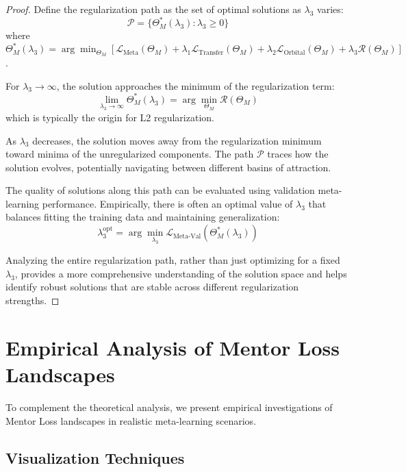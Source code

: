 \begin{proof}
Define the regularization path as the set of optimal solutions as $\lambda_3$ varies:
\begin{equation}
\mathcal{P} = \{\Theta_M^*(\lambda_3) : \lambda_3 \geq 0\}
\end{equation}
where $\Theta_M^*(\lambda_3) = \arg\min_{\Theta_M} [\mathcal{L}_{\text{Meta}}(\Theta_M) + \lambda_1 \mathcal{L}_{\text{Transfer}}(\Theta_M) + \lambda_2 \mathcal{L}_{\text{Orbital}}(\Theta_M) + \lambda_3 \mathcal{R}(\Theta_M)]$.

For $\lambda_3 \to \infty$, the solution approaches the minimum of the regularization term:
\begin{equation}
\lim_{\lambda_3 \to \infty} \Theta_M^*(\lambda_3) = \arg\min_{\Theta_M} \mathcal{R}(\Theta_M)
\end{equation}
which is typically the origin for L2 regularization.

As $\lambda_3$ decreases, the solution moves away from the regularization minimum toward minima of the unregularized components. The path $\mathcal{P}$ traces how the solution evolves, potentially navigating between different basins of attraction.

The quality of solutions along this path can be evaluated using validation meta-learning performance. Empirically, there is often an optimal value of $\lambda_3$ that balances fitting the training data and maintaining generalization:
\begin{equation}
\lambda_3^{\text{opt}} = \arg\min_{\lambda_3} \mathcal{L}_{\text{Meta-Val}}(\Theta_M^*(\lambda_3))
\end{equation}

Analyzing the entire regularization path, rather than just optimizing for a fixed $\lambda_3$, provides a more comprehensive understanding of the solution space and helps identify robust solutions that are stable across different regularization strengths.
\end{proof}

\section{Empirical Analysis of Mentor Loss Landscapes}

To complement the theoretical analysis, we present empirical investigations of Mentor Loss landscapes in realistic meta-learning scenarios.

\subsection{Visualization Techniques}

